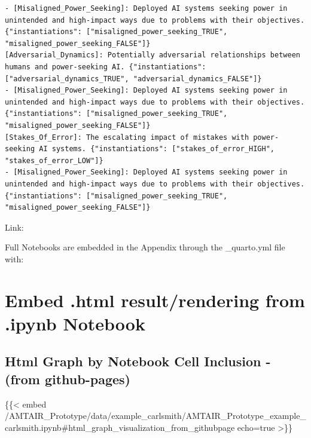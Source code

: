 \documentclass[
  11pt,
  letterpaper,
]{book}
\newenvironment{Shaded}{\begin{snugshade}}{\end{snugshade}}
\newcommand{\NormalTok}[1]{\textcolor[rgb]{0.00,0.23,0.31}{#1}}
\begin{document}
\begin{verbatim}
- [Misaligned_Power_Seeking]: Deployed AI systems seeking power in unintended and high-impact ways due to problems with their objectives. {"instantiations": ["misaligned_power_seeking_TRUE", "misaligned_power_seeking_FALSE"]}
[Adversarial_Dynamics]: Potentially adversarial relationships between humans and power-seeking AI. {"instantiations": ["adversarial_dynamics_TRUE", "adversarial_dynamics_FALSE"]}
- [Misaligned_Power_Seeking]: Deployed AI systems seeking power in unintended and high-impact ways due to problems with their objectives. {"instantiations": ["misaligned_power_seeking_TRUE", "misaligned_power_seeking_FALSE"]}
[Stakes_Of_Error]: The escalating impact of mistakes with power-seeking AI systems. {"instantiations": ["stakes_of_error_HIGH", "stakes_of_error_LOW"]}
- [Misaligned_Power_Seeking]: Deployed AI systems seeking power in unintended and high-impact ways due to problems with their objectives. {"instantiations": ["misaligned_power_seeking_TRUE", "misaligned_power_seeking_FALSE"]}
\end{verbatim}

Link:

Full Notebooks are embedded in the Appendix through the \_quarto.yml
file with:

\section*{Embed .html result/rendering from .ipynb
Notebook}\label{embed-.html-resultrendering-from-.ipynb-notebook}


\subsection*{Html Graph by Notebook Cell Inclusion - (from
github-pages)}\label{html-graph-by-notebook-cell-inclusion---from-github-pages}

\begin{Shaded}
\begin{Highlighting}[]
\NormalTok{\{\{\textless{} embed /AMTAIR\_Prototype/data/example\_carlsmith/AMTAIR\_Prototype\_example\_carlsmith.ipynb\#html\_graph\_visualization\_from\_githubpage echo=true \textgreater{}\}\}}
\end{Highlighting}
\end{Shaded}
\end{document}
